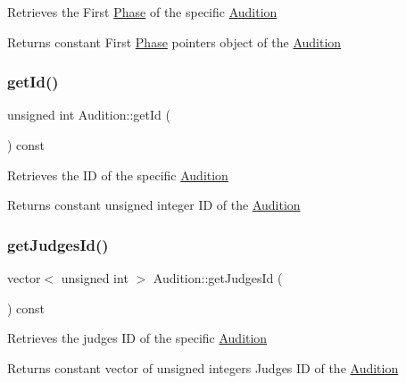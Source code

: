 Retrieves the First \hyperlink{class_phase}{Phase} of the specific \hyperlink{class_audition}{Audition} \begin{DoxyReturn}{Returns}
constant First \hyperlink{class_phase}{Phase} pointer\textquotesingle{}s object of the \hyperlink{class_audition}{Audition} 
\end{DoxyReturn}
\mbox{\label{class_audition_a938690d2670e525b808a6ba4aa485877}} 
\subsubsection{\texorpdfstring{get\+Id()}{getId()}}
{\footnotesize\ttfamily unsigned int Audition\+::get\+Id (\begin{DoxyParamCaption}{ }\end{DoxyParamCaption}) const}

Retrieves the ID of the specific \hyperlink{class_audition}{Audition} \begin{DoxyReturn}{Returns}
constant unsigned integer ID of the \hyperlink{class_audition}{Audition} 
\end{DoxyReturn}
\mbox{\label{class_audition_a405624b42fb47c297b3e11cc7c63e209}} 
\subsubsection{\texorpdfstring{get\+Judges\+Id()}{getJudgesId()}}
{\footnotesize\ttfamily vector$<$ unsigned int $>$ Audition\+::get\+Judges\+Id (\begin{DoxyParamCaption}{ }\end{DoxyParamCaption}) const}

Retrieves the judges\textquotesingle{} ID of the specific \hyperlink{class_audition}{Audition} \begin{DoxyReturn}{Returns}
constant vector of unsigned integers Judges\textquotesingle{} ID of the \hyperlink{class_audition}{Audition} 
\end{DoxyReturn}
\mbox{\label{class_audition_af89b61cd4d55a1bee8d3590b1d6198c8}} 
